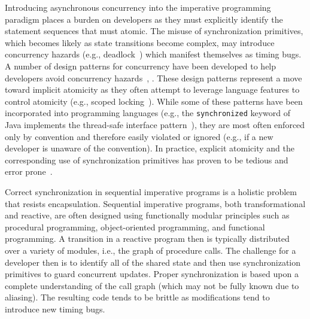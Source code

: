 Introducing asynchronous concurrency into the imperative programming paradigm places a burden on developers as they must explicitly identify the statement sequences that must atomic.
The misuse of synchronization primitives, which becomes likely as state transitions become complex, may introduce concurrency hazards (e.g., deadlock~\cite{dijkstra1965cooperating}) which manifest themselves as timing bugs.
A number of design patterns for concurrency have been developed to help developers avoid concurrency hazards~\cite{schmidt2000pattern}, \cite{lea2000concurrent}.
These design patterns represent a move toward implicit atomicity as they often attempt to leverage language features to control atomicity (e.g., scoped locking~\cite{schmidt2000pattern}).
While some of these patterns have been incorporated into programming languages (e.g., the \verb+synchronized+ keyword of Java implements the thread-safe interface pattern~\cite{schmidt2000pattern}), they are most often enforced only by convention and therefore easily violated or ignored (e.g., if a new developer is unaware of the convention).
In practice, explicit atomicity and the corresponding use of synchronization primitives has proven to be tedious and error prone~\cite{sutter2005software}.

Correct synchronization in sequential imperative programs is a holistic problem that resists encapsulation.
Sequential imperative programs, both transformational and reactive, are often designed using functionally modular principles such as procedural programming, object-oriented programming, and functional programming.
A transition in a reactive program then is typically distributed over a variety of modules, i.e., the graph of procedure calls.
The challenge for a developer then is to identify all of the shared state and then use synchronization primitives to guard concurrent updates.
Proper synchronization is based upon a complete understanding of the call graph (which may not be fully known due to aliasing).
The resulting code tends to be brittle as modifications tend to introduce new timing bugs.

